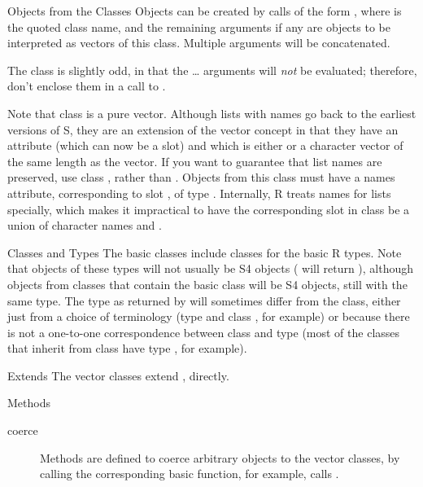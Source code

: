 %
\begin{Section}{Objects from the Classes}
Objects can be created by calls of the form ,
where  is the quoted class name, and the remaining
arguments if any are objects to be interpreted as vectors of this
class.  Multiple arguments will be concatenated.

The class  is slightly odd, in that the \dots
arguments will \emph{not} be evaluated; therefore, don't enclose them
in a call to .

Note that class  is a pure vector.  Although lists with
names go back to the earliest versions of S, they are an extension
of the vector concept in that they have an attribute (which can now
be a slot) and which is either  or a character vector of
the same length as the vector.  If you want to guarantee that list
names are preserved, use class , rather than
.  Objects from this class must have a names attribute,
corresponding to slot ,
of type .  Internally, R treats names for
lists  specially, which makes it impractical to have the corresponding slot in
class  be a union of character names and .

\end{Section}
%
\begin{Section}{Classes and Types}
The basic classes include classes for the basic R types.  Note that
objects of these types will not usually be S4 objects
( will return ), although objects from
classes that contain the basic class will be S4 objects, still with
the same type.  The type as
returned by  will sometimes differ from the class,
either just from a choice of terminology (type  and
class , for example) or because there is not a one-to-one
correspondence between class and type (most of the classes that
inherit from class  have type , for example).
\end{Section}
%
\begin{Section}{Extends}
The vector classes extend , directly.
\end{Section}
%
\begin{Section}{Methods}
\begin{description}

\item[coerce] Methods are defined to coerce arbitrary objects to
the vector classes, by calling the corresponding basic function, for
example,  calls . 

\end{description}

\end{Section}
